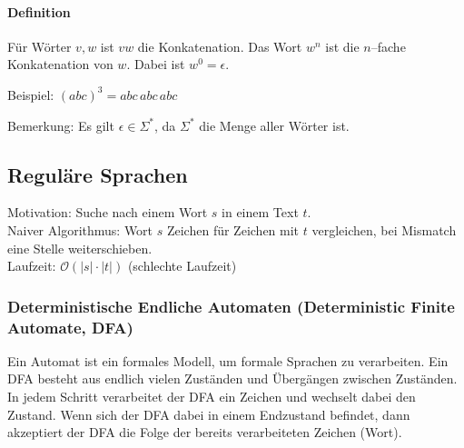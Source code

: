 \documentclass[a4paper]{scrartcl}
\begin{document}
\paragraph{Definition} Für Wörter $v,w$ ist $vw$ die Konkatenation. Das Wort $w^n$ ist die $n$--fache Konkatenation von $w$. Dabei ist $w^0 = \epsilon$.

Beispiel: $(abc)^3 = abc\, abc\, abc$

Bemerkung: Es gilt $\epsilon \in \Sigma^*$, da $\Sigma^*$ die Menge aller Wörter ist.

\subsection{Reguläre Sprachen}
Motivation: Suche nach einem Wort $s$ in einem Text $t$.\\
Naiver Algorithmus: Wort $s$ Zeichen für Zeichen mit $t$ vergleichen, bei Mismatch eine Stelle weiterschieben.\\
Laufzeit: $\mathcal{O}(\lvert s \rvert \cdot  \lvert t \rvert)$ (schlechte Laufzeit)

\subsubsection{Deterministische Endliche Automaten (Deterministic Finite Automate, DFA)}
Ein Automat ist ein formales Modell, um formale Sprachen zu verarbeiten. Ein DFA besteht aus endlich vielen Zuständen und Übergängen zwischen Zuständen. In jedem Schritt verarbeitet der DFA ein Zeichen und wechselt dabei den Zustand. Wenn sich der DFA dabei in einem Endzustand befindet, dann akzeptiert der DFA die Folge der bereits verarbeiteten Zeichen (Wort).

\end{document}
